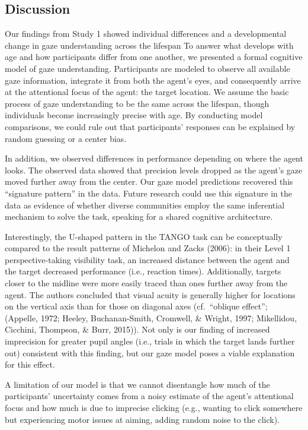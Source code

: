 \documentclass[
  man,mask,floatsintext]{apa6}
\begin{document}
\hypertarget{discussion-1}{%
\subsection{Discussion}\label{discussion-1}}

Our findings from Study 1 showed individual differences and a developmental change in gaze understanding across the lifespan To answer what develops with age and how participants differ from one another, we presented a formal cognitive model of gaze understanding. Participants are modeled to observe all available gaze information, integrate it from both the agent's eyes, and consequently arrive at the attentional focus of the agent: the target location. We assume the basic process of gaze understanding to be the same across the lifespan, though individuals become increasingly precise with age. By conducting model comparisons, we could rule out that participants' responses can be explained by random guessing or a center bias.

In addition, we observed differences in performance depending on where the agent looks. The observed data showed that precision levels dropped as the agent's gaze moved further away from the center. Our gaze model predictions recovered this ``signature pattern'' in the data. Future research could use this signature in the data as evidence of whether diverse communities employ the same inferential mechanism to solve the task, speaking for a shared cognitive architecture.

Interestingly, the U-shaped pattern in the TANGO task can be conceptually compared to the result patterns of Michelon and Zacks (2006): in their Level 1 perspective-taking visibility task, an increased distance between the agent and the target decreased performance (i.e., reaction times). Additionally, targets closer to the midline were more easily traced than ones further away from the agent. The authors concluded that visual acuity is generally higher for locations on the vertical axis than for those on diagonal axes (cf.~``oblique effect''; (Appelle, 1972; Heeley, Buchanan-Smith, Cromwell, \& Wright, 1997; Mikellidou, Cicchini, Thompson, \& Burr, 2015)). Not only is our finding of increased imprecision for greater pupil angles (i.e., trials in which the target lands further out) consistent with this finding, but our gaze model poses a viable explanation for this effect.

A limitation of our model is that we cannot disentangle how much of the participants' uncertainty comes from a noisy estimate of the agent's attentional focus and how much is due to imprecise clicking (e.g., wanting to click somewhere but experiencing motor issues at aiming, adding random noise to the click).
\end{document}
